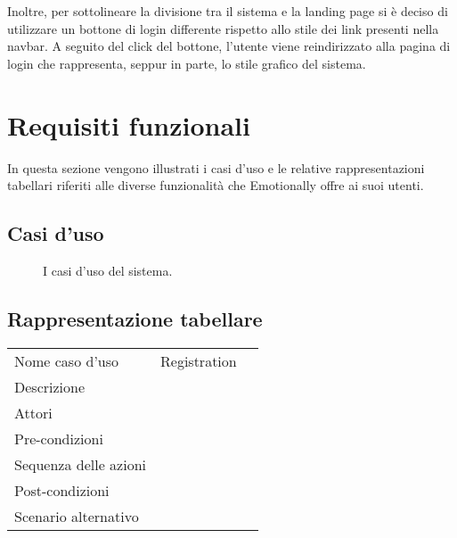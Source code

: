 Inoltre, per sottolineare la divisione tra il sistema e la landing page si è 
deciso di utilizzare un bottone di login differente rispetto allo stile dei 
link presenti nella navbar. A seguito del click del bottone, l'utente viene 
reindirizzato alla pagina di login che rappresenta, seppur in parte, lo stile 
grafico del sistema.

\section{Requisiti funzionali}\label{sec:requisiti-funzionali}

In questa sezione vengono illustrati i casi d'uso e le relative 
rappresentazioni tabellari riferiti alle diverse funzionalità che Emotionally 
offre ai suoi utenti. 

\subsection{Casi d'uso}

\begin{figure}[H]
	\centering
    \caption{I casi d'uso del sistema.}
    \label{fig:casi-duso}
    \resizebox{\textwidth}{!}{%
        
    }
\end{figure}

\subsection{Rappresentazione tabellare}
\begin{table}[H]
	\centering
	\caption{Use Case: Test analysis}
	\label{tab:use-case-test-analysis}
	\begin{longtable}{@{}|>{\centering\arraybackslash}m{}|m{}|>{\centering\arraybackslash}m{}|@{}}
		
		Nome caso d'uso & Registration \\
		Descrizione & \\
		Attori & \\
		Pre-condizioni & \\
		Sequenza delle azioni & \\
		Post-condizioni & \\
		Scenario alternativo & \\
		
	\end{longtable}
\end{table}

